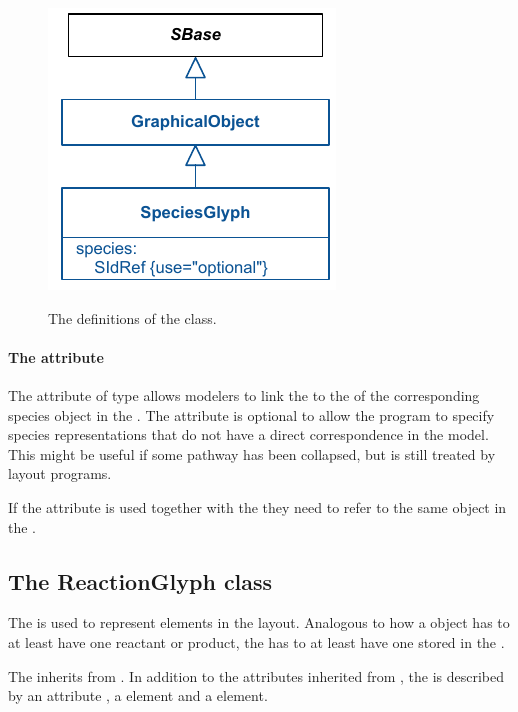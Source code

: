 \begin{figure}[!ht]
\includegraphics{uml/layout-speciesglyph-uml}\\
\label{uml:speciesglyph}
\caption{The definitions of the \SpeciesGlyph class.}
\end{figure}

\paragraph{The  attribute}
The  attribute of type  allows modelers 
to link the \SpeciesGlyph to the  of the corresponding species 
object in the \Model. The  attribute is optional to allow 
the program to specify species representations that do not have a direct 
correspondence in the model. This might be useful if some pathway has 
been collapsed, but is still treated by layout programs. 

If the  attribute is used together with the  
they need to refer to the same object in the \Model.

\subsection{The ReactionGlyph class}
\label{reactionglyph-class}
The \ReactionGlyph is used to represent \Reaction elements in the 
layout. Analogous to how a \Reaction object has to at least have one reactant 
or product, the \ReactionGlyph has to at least have one 
\SpeciesReferenceGlyph stored in the \ListOfSpeciesReferenceGlyphs. 

The \ReactionGlyph inherits from \GraphicalObject. In addition to the 
attributes inherited from \GraphicalObject, the \ReactionGlyph is 
described by an attribute , a \Curve element and a 
 element. 

